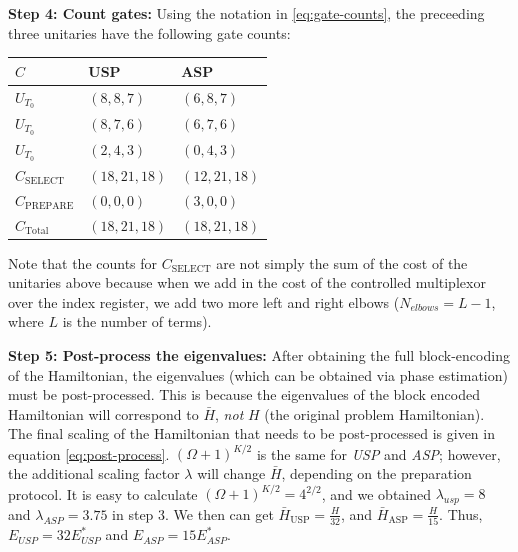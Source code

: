 \textbf{Step 4: Count gates:} Using the notation in \ref{eq:gate-counts}, the preceeding three unitaries have the following gate counts:

\begin{center}
    \begin{tabular}{ |p{2cm}||p{3cm}|p{3cm}|}
        \hline
        $C$& USP &ASP\\
        \hline
        $U_{T_0}$   & $(8, 8, 7)$    &$(6, 8, 7)$\\
        $U_{T_0}$   & $(8, 7, 6)$    &$(6, 7, 6)$\\
        $U_{T_0}$   & $(2, 4, 3)$    &$(0, 4, 3)$\\
        \hline
        $C_{\text{SELECT}}$ & $(18, 21, 18)$ &$(12, 21, 18)$\\
        $C_{\text{PREPARE}}$ & $(0, 0, 0)$ &$(3, 0, 0)$\\
        \hline
        $C_{\text{Total}}$ & $(18, 21, 18)$& $(18, 21, 18)$\\
        \hline
       \end{tabular}
\end{center}

Note that the counts for $C_{\text{SELECT}}$ are not simply the sum of the cost of the unitaries above because when we add in the cost of the controlled multiplexor over the index register, we add two more left and right elbows ($N_{elbows} = L - 1$, where $L$ is the number of terms). 

\textbf{Step 5: Post-process the eigenvalues:} After obtaining the full block-encoding of the Hamiltonian, the eigenvalues (which can be obtained via phase estimation) must be post-processed. This is because the eigenvalues of the block encoded Hamiltonian will correspond to $\bar{H}$, \textit{not} $H$ (the original problem Hamiltonian).
The final scaling of the Hamiltonian that needs to be post-processed is given in equation \ref{eq:post-process}. $(\Omega + 1)^{K / 2}$ is the same for \textit{USP} and \textit{ASP}; however, the additional scaling factor $\lambda$ will change $\bar{H}$, depending on the preparation protocol. It is easy to calculate $(\Omega + 1)^{K/2} = 4^{2/2}$, and we obtained $\lambda_{usp} = 8$ and $\lambda_{ASP} = 3.75$ in step 3. 
We then can get $\bar{H}_{\text{USP}} = \frac{H}{32}$, and $\bar{H}_{\text{ASP}} = \frac{H}{15}$. Thus, $E_{USP} = 32E^*_{USP}$ and $E_{ASP} = 15E^*_{ASP}$.